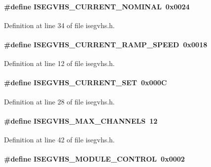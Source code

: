 \paragraph[{ISEGVHS\_\-CURRENT\_\-NOMINAL}]{\setlength{\rightskip}{0pt plus 5cm}\#define ISEGVHS\_\-CURRENT\_\-NOMINAL~0x0024}\hfill\label{isegvhs_8h_a0a53f2809706e1260ac529b3ee06aa00}


Definition at line 34 of file isegvhs.h.
\paragraph[{ISEGVHS\_\-CURRENT\_\-RAMP\_\-SPEED}]{\setlength{\rightskip}{0pt plus 5cm}\#define ISEGVHS\_\-CURRENT\_\-RAMP\_\-SPEED~0x0018}\hfill\label{isegvhs_8h_a4141f2442945d88bffb4ab5e2e9eb3b0}


Definition at line 12 of file isegvhs.h.
\paragraph[{ISEGVHS\_\-CURRENT\_\-SET}]{\setlength{\rightskip}{0pt plus 5cm}\#define ISEGVHS\_\-CURRENT\_\-SET~0x000C}\hfill\label{isegvhs_8h_a606ba518a1ba8e9c5d073830d43d6f6e}


Definition at line 28 of file isegvhs.h.
\paragraph[{ISEGVHS\_\-MAX\_\-CHANNELS}]{\setlength{\rightskip}{0pt plus 5cm}\#define ISEGVHS\_\-MAX\_\-CHANNELS~12}\hfill\label{isegvhs_8h_a01a5ad75139758e25e86f78c120b4498}


Definition at line 42 of file isegvhs.h.
\paragraph[{ISEGVHS\_\-MODULE\_\-CONTROL}]{\setlength{\rightskip}{0pt plus 5cm}\#define ISEGVHS\_\-MODULE\_\-CONTROL~0x0002}\hfill\label{isegvhs_8h_a49aced6f04dead761a3ed33534d92c01}


